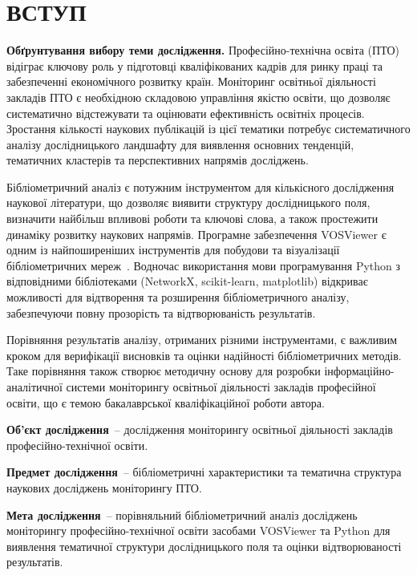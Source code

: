 \section*{\centering ВСТУП}

\textbf{Обґрунтування вибору теми дослідження.} Професійно-технічна освіта (ПТО) відіграє ключову роль у підготовці кваліфікованих кадрів для ринку праці та забезпеченні економічного розвитку країн. Моніторинг освітньої діяльності закладів ПТО є необхідною складовою управління якістю освіти, що дозволяє систематично відстежувати та оцінювати ефективність освітніх процесів. Зростання кількості наукових публікацій із цієї тематики потребує систематичного аналізу дослідницького ландшафту для виявлення основних тенденцій, тематичних кластерів та перспективних напрямів досліджень.

Бібліометричний аналіз є потужним інструментом для кількісного дослідження наукової літератури, що дозволяє виявити структуру дослідницького поля, визначити найбільш впливові роботи та ключові слова, а також простежити динаміку розвитку наукових напрямів. Програмне забезпечення VOSViewer є одним із найпоширеніших інструментів для побудови та візуалізації бібліометричних мереж~\cite{vanEck2010}. Водночас використання мови програмування Python з відповідними бібліотеками (NetworkX, scikit-learn, matplotlib) відкриває можливості для відтворення та розширення бібліометричного аналізу, забезпечуючи повну прозорість та відтворюваність результатів.

Порівняння результатів аналізу, отриманих різними інструментами, є важливим кроком для верифікації висновків та оцінки надійності бібліометричних методів. Таке порівняння також створює методичну основу для розробки інформаційно-аналітичної системи моніторингу освітньої діяльності закладів професійної освіти, що є темою бакалаврської кваліфікаційної роботи автора.

\textbf{Об'єкт дослідження}~-- дослідження моніторингу освітньої діяльності закладів професійно-технічної освіти.

\textbf{Предмет дослідження}~-- бібліометричні характеристики та тематична структура наукових досліджень моніторингу ПТО.

\textbf{Мета дослідження}~-- порівняльний бібліометричний аналіз досліджень моніторингу професійно-технічної освіти засобами VOSViewer та Python для виявлення тематичної структури дослідницького поля та оцінки відтворюваності результатів.

